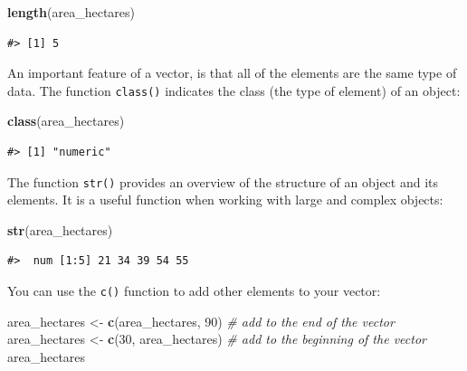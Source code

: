 \documentclass[
]{book}
\newenvironment{Shaded}{\begin{snugshade}}{\end{snugshade}}
\newcommand{\CommentTok}[1]{\textcolor[rgb]{0.56,0.35,0.01}{\textit{#1}}}
\newcommand{\DecValTok}[1]{\textcolor[rgb]{0.00,0.00,0.81}{#1}}
\newcommand{\FunctionTok}[1]{\textcolor[rgb]{0.13,0.29,0.53}{\textbf{#1}}}
\newcommand{\NormalTok}[1]{#1}
\newcommand{\OtherTok}[1]{\textcolor[rgb]{0.56,0.35,0.01}{#1}}
\begin{document}
\begin{Shaded}
\begin{Highlighting}[]
\FunctionTok{length}\NormalTok{(area\_hectares)}
\end{Highlighting}
\end{Shaded}

\begin{verbatim}
#> [1] 5
\end{verbatim}

An important feature of a vector, is that all of the elements are the same type of data.
The function \texttt{class()} indicates the class (the type of element) of an object:

\begin{Shaded}
\begin{Highlighting}[]
\FunctionTok{class}\NormalTok{(area\_hectares)}
\end{Highlighting}
\end{Shaded}

\begin{verbatim}
#> [1] "numeric"
\end{verbatim}

The function \texttt{str()} provides an overview of the structure of an object and its
elements. It is a useful function when working with large and complex
objects:

\begin{Shaded}
\begin{Highlighting}[]
\FunctionTok{str}\NormalTok{(area\_hectares)}
\end{Highlighting}
\end{Shaded}

\begin{verbatim}
#>  num [1:5] 21 34 39 54 55
\end{verbatim}

You can use the \texttt{c()} function to add other elements to your vector:

\begin{Shaded}
\begin{Highlighting}[]
\NormalTok{area\_hectares }\OtherTok{\textless{}{-}} \FunctionTok{c}\NormalTok{(area\_hectares, }\DecValTok{90}\NormalTok{) }\CommentTok{\# add to the end of the vector}
\NormalTok{area\_hectares }\OtherTok{\textless{}{-}} \FunctionTok{c}\NormalTok{(}\DecValTok{30}\NormalTok{, area\_hectares) }\CommentTok{\# add to the beginning of the vector}
\NormalTok{area\_hectares}
\end{Highlighting}
\end{Shaded}
\end{document}
